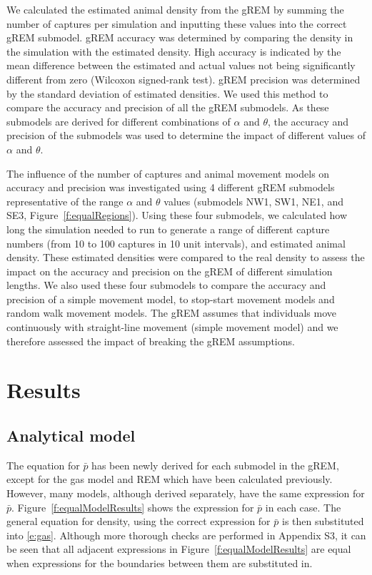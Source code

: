 \documentclass[a4paper,10pt,reqno,oneside]{amsart}
\begin{document}
We calculated the estimated animal density from the gREM by summing the number of captures per simulation and inputting these values into the correct gREM submodel. gREM accuracy was determined by comparing the density in the simulation with the estimated density. High accuracy is indicated by the mean difference between the estimated and actual values not being significantly different from zero (Wilcoxon signed-rank test). gREM precision was determined by the standard deviation of estimated densities. We used this method to compare the accuracy and precision of all the gREM submodels. As these submodels are derived for different combinations of $\alpha$ and $\theta$, the accuracy and precision of the submodels was used to determine the impact of different values of $\alpha$ and $\theta$. 

The influence of the number of captures and animal movement models on accuracy and precision was investigated using 4 different gREM submodels representative of the range $\alpha$ and $\theta$ values (submodels NW1, SW1, NE1, and SE3, Figure~\ref{f:equalRegions}). Using these four submodels, we calculated how long the simulation needed to run to generate a range of different capture numbers (from 10 to 100 captures in 10 unit intervals), and estimated animal density. These estimated densities were compared to the real density to assess the impact on the accuracy and precision on the gREM of different simulation lengths. We also used these four submodels to compare the accuracy and precision of a simple movement model, to stop-start movement models and random walk movement models. The gREM assumes that individuals move continuously with straight-line movement (simple movement model) and we therefore assessed the impact of breaking the gREM assumptions. 


\section*{Results}

\subsection*{Analytical model}

The equation for $\bar{p}$ has been newly derived for each submodel in the gREM, except for the gas model and REM which have been calculated previously. However, many models, although derived separately, have the same expression for $\bar{p}$. Figure~\ref{f:equalModelResults} shows the expression for $\bar{p}$ in each case. The general equation for density, using the correct expression for $\bar{p}$ is then substituted into \ref{e:gas}. Although more thorough checks are performed in Appendix S3, it can be seen that all adjacent expressions in Figure~\ref{f:equalModelResults} are equal when expressions for the boundaries between them are substituted in.
\end{document}
